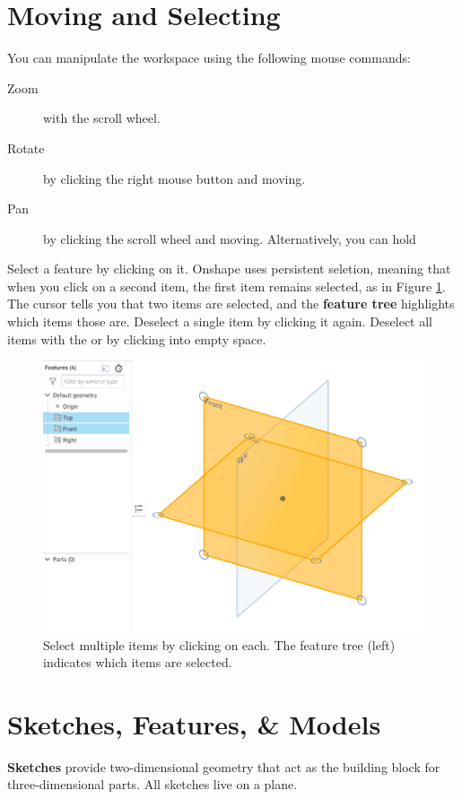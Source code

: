 
\section{Moving and Selecting}
You can manipulate the workspace using the following 
mouse commands:

\begin{description}
\item[Zoom] with the scroll wheel.
\item[Rotate] by clicking the right mouse button and moving.
\item[Pan] by clicking the scroll wheel and moving.
Alternatively, you can hold 
\end{description}

Select a feature by clicking on it. Onshape uses persistent seletion, meaning that when you click on a second item, the first item remains selected, as in Figure \ref{chap01_selection}. The cursor tells you that two items are selected, and the {\bf feature tree} highlights which items those are. Deselect a single item by clicking it again. Deselect all items with the  or by clicking into empty space.

\begin{figure}[ht!]
\centerline{\includegraphics[width=5in]{figs/chap01_selection.png}}
\caption{Select multiple items by clicking on each. The feature tree (left) indicates which items are selected.}
\label{chap01_selection}
\end{figure}

\section{Sketches, Features, \& Models}
{\bf Sketches} provide two-dimensional geometry that act as the building block for three-dimensional parts. All sketches live on a plane. 

